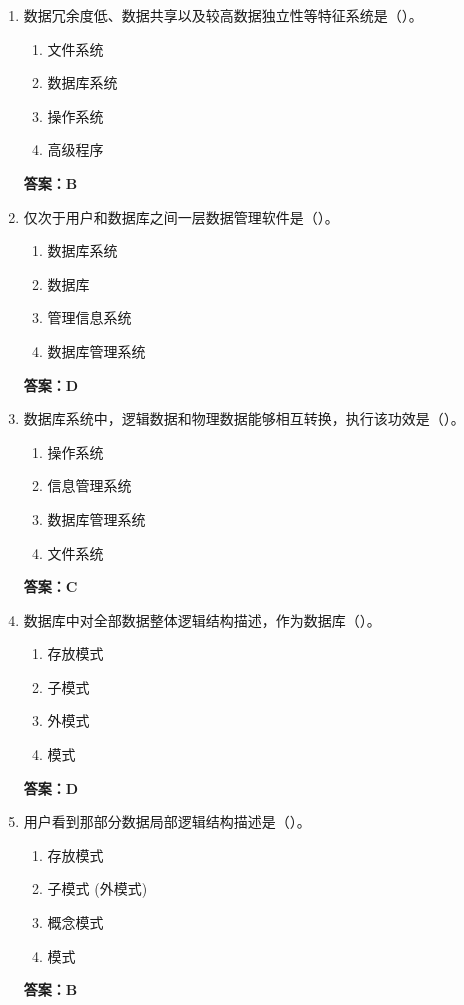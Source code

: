 \documentclass[12pt, a4paper]{article}
\begin{document}
\begin{enumerate}[label=\arabic*.]
    \item 数据冗余度低、数据共享以及较高数据独立性等特征系统是（\quad）。
    \begin{enumerate}
        \item 文件系统
        \item 数据库系统
        \item 操作系统
        \item 高级程序
    \end{enumerate}
    \textbf{答案：B}

    \item 仅次于用户和数据库之间一层数据管理软件是（\quad）。
    \begin{enumerate}
        \item 数据库系统
        \item 数据库
        \item 管理信息系统
        \item 数据库管理系统
    \end{enumerate}
    \textbf{答案：D}

    \item 数据库系统中，逻辑数据和物理数据能够相互转换，执行该功效是（\quad）。
    \begin{enumerate}
        \item 操作系统
        \item 信息管理系统
        \item 数据库管理系统
        \item 文件系统
    \end{enumerate}
    \textbf{答案：C}

    \item 数据库中对全部数据整体逻辑结构描述，作为数据库（\quad）。
    \begin{enumerate}
        \item 存放模式
        \item 子模式
        \item 外模式
        \item 模式
    \end{enumerate}
    \textbf{答案：D}

    \item 用户看到那部分数据局部逻辑结构描述是（\quad）。
    \begin{enumerate}
        \item 存放模式
        \item 子模式 (外模式)
        \item 概念模式
        \item 模式
    \end{enumerate}
    \textbf{答案：B}


\end{enumerate}
\end{document}
